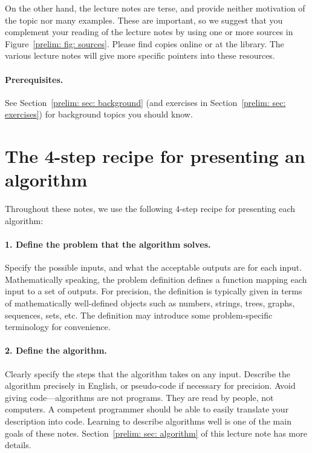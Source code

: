 \documentclass[11pt]{article}
\begin{document}

On the other hand, the lecture notes are terse,
and provide neither motivation of the topic nor many examples.
These are important,
so we suggest that you complement your reading of the lecture notes
by using one or more sources in Figure~\ref{prelim: fig: sources}.
Please find copies online or at the library.
The various lecture notes will give more specific pointers into these resources.


\paragraph{Prerequisites.}
See Section~\ref{prelim: sec: background}
(and exercises in Section~\ref{prelim: sec: exercises})
for background topics you should know.

\newpage

\section{The 4-step recipe for presenting an algorithm}

Throughout these notes, we use the following 4-step recipe for presenting each algorithm:

\paragraph{1. Define the problem that the algorithm solves.}  Specify the possible inputs, and what the acceptable outputs are for each input.  Mathematically speaking, the problem definition defines a function mapping each input to a set of outputs.  For precision, the definition is typically given in terms of mathematically well-defined objects such as numbers, strings, trees, graphs, sequences, sets, etc.  The definition may introduce some problem-specific terminology for convenience.

\paragraph{2. Define the algorithm.}  Clearly specify the steps that the algorithm takes on any input.
 Describe the algorithm precisely in English, or pseudo-code if necessary for precision.
 Avoid giving code---algorithms are not programs.  They are read by people, not computers.
 A competent programmer should be able to easily translate your description into code.
 Learning to describe algorithms well is one of the main goals of these notes.
 Section~\ref{prelim: sec: algorithm} of this lecture note has more details.
\end{document}
